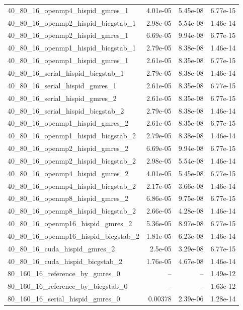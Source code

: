\documentclass[11pt]{article}
\begin{document}
\begin{longtable}{lrrr}
40\_80\_16\_openmp4\_hispid\_gmres\_1 & 4.01e-05 & 5.45e-08 & 6.77e-15\\
40\_80\_16\_openmp2\_hispid\_bicgstab\_1 & 2.98e-05 & 5.54e-08 & 1.46e-14\\
40\_80\_16\_openmp2\_hispid\_gmres\_1 & 6.69e-05 & 9.94e-08 & 6.77e-15\\
40\_80\_16\_openmp1\_hispid\_bicgstab\_1 & 2.79e-05 & 8.38e-08 & 1.46e-14\\
40\_80\_16\_openmp1\_hispid\_gmres\_1 & 2.61e-05 & 8.35e-08 & 6.77e-15\\
40\_80\_16\_serial\_hispid\_bicgstab\_1 & 2.79e-05 & 8.38e-08 & 1.46e-14\\
40\_80\_16\_serial\_hispid\_gmres\_1 & 2.61e-05 & 8.35e-08 & 6.77e-15\\
40\_80\_16\_serial\_hispid\_gmres\_2 & 2.61e-05 & 8.35e-08 & 6.77e-15\\
40\_80\_16\_serial\_hispid\_bicgstab\_2 & 2.79e-05 & 8.38e-08 & 1.46e-14\\
40\_80\_16\_openmp1\_hispid\_gmres\_2 & 2.61e-05 & 8.35e-08 & 6.77e-15\\
40\_80\_16\_openmp1\_hispid\_bicgstab\_2 & 2.79e-05 & 8.38e-08 & 1.46e-14\\
40\_80\_16\_openmp2\_hispid\_gmres\_2 & 6.69e-05 & 9.94e-08 & 6.77e-15\\
40\_80\_16\_openmp2\_hispid\_bicgstab\_2 & 2.98e-05 & 5.54e-08 & 1.46e-14\\
40\_80\_16\_openmp4\_hispid\_gmres\_2 & 4.01e-05 & 5.45e-08 & 6.77e-15\\
40\_80\_16\_openmp4\_hispid\_bicgstab\_2 & 2.17e-05 & 3.66e-08 & 1.46e-14\\
40\_80\_16\_openmp8\_hispid\_gmres\_2 & 6.86e-05 & 9.75e-08 & 6.77e-15\\
40\_80\_16\_openmp8\_hispid\_bicgstab\_2 & 2.66e-05 & 4.28e-08 & 1.46e-14\\
40\_80\_16\_openmp16\_hispid\_gmres\_2 & 5.36e-05 & 8.97e-08 & 6.77e-15\\
40\_80\_16\_openmp16\_hispid\_bicgstab\_2 & 1.81e-05 & 6.23e-08 & 1.46e-14\\
40\_80\_16\_cuda\_hispid\_gmres\_2 & 2.5e-05 & 3.29e-08 & 6.77e-15\\
40\_80\_16\_cuda\_hispid\_bicgstab\_2 & 1.76e-05 & 4.67e-08 & 1.46e-14\\
80\_160\_16\_reference\_by\_gmres\_0 & -- & -- & 1.49e-12\\
80\_160\_16\_reference\_by\_bicgstab\_0 & -- & -- & 1.63e-12\\
80\_160\_16\_serial\_hispid\_gmres\_0 & 0.00378 & 2.39e-06 & 1.28e-14\\

\end{longtable}
\end{document}
